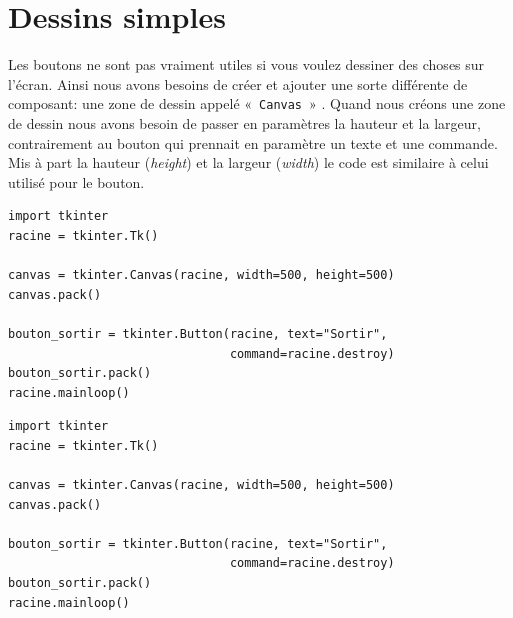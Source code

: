 \section{Dessins simples}

Les boutons ne sont pas vraiment utiles si vous voulez dessiner des choses sur l'écran. Ainsi nous avons besoins de créer et ajouter une sorte différente de composant: une zone de dessin appelé «~\texttt{Canvas}~» . Quand nous créons une zone de dessin nous avons besoin de passer en paramètres la hauteur et la largeur, contrairement au bouton qui prennait en paramètre un texte et une commande. Mis à part la hauteur (\emph{height}) et la largeur (\emph{width}) le code est similaire à celui utilisé pour le bouton.

\begin{Verbatim}[frame=single,rulecolor=\color{mbleu}, label=à taper]
import tkinter
racine = tkinter.Tk()

canvas = tkinter.Canvas(racine, width=500, height=500)
canvas.pack()

bouton_sortir = tkinter.Button(racine, text="Sortir",
                               command=racine.destroy)
bouton_sortir.pack()
racine.mainloop()
\end{Verbatim}

\begin{Verbatim}[frame=single,rulecolor=\color{mbleu}, label=à taper]
import tkinter
racine = tkinter.Tk()

canvas = tkinter.Canvas(racine, width=500, height=500)
canvas.pack()

bouton_sortir = tkinter.Button(racine, text="Sortir",
                               command=racine.destroy)
bouton_sortir.pack()
racine.mainloop()
\end{Verbatim}

